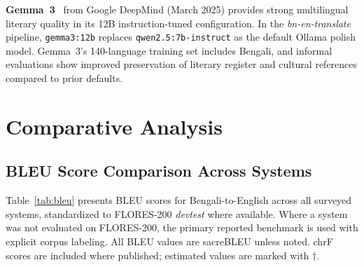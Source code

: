 \documentclass[conference]{IEEEtran}
\begin{document}
\textbf{Gemma~3}~\cite{gemma2025} from Google DeepMind (March 2025) provides
strong multilingual literary quality in its 12B instruction-tuned configuration.
In the \textit{bn-en-translate} pipeline, \texttt{gemma3:12b} replaces
\texttt{qwen2.5:7b-instruct} as the default Ollama polish model.
Gemma~3's 140-language training set includes Bengali, and informal evaluations
show improved preservation of literary register and cultural references
compared to prior defaults.

\section{Comparative Analysis}
\label{sec:comparison}

\subsection{BLEU Score Comparison Across Systems}

Table~\ref{tab:bleu} presents BLEU scores for Bengali-to-English across
all surveyed systems, standardized to FLORES-200 \textit{devtest} where
available.
Where a system was not evaluated on FLORES-200, the primary reported
benchmark is used with explicit corpus labeling.
All BLEU values are sacreBLEU unless noted.
chrF scores are included where published; estimated values are marked
with $\dagger$.
\end{document}
